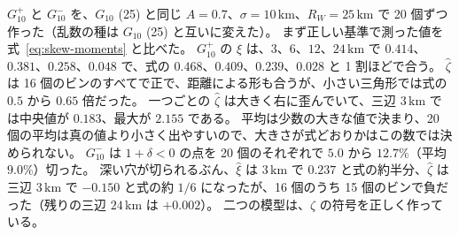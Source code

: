 \documentclass[a4paper,11pt]{ltjsarticle}
\begin{document}
\begin{table}[t]
  \centering
  \caption{表~\ref{tab:vary-r-mocks} と同じ測り方で、$G$ の $R_W$・振幅・場の幅を変えた模擬データ（各 20 個）。
    $G_{\sigma}$ の添字は場の幅 [km]、$G_{10}^{0.4}$ は振幅 $A = 0.4$（ほかは $A = 0.7$）、括弧の中は $R_W$ [km]。}
  \label{tab:vary-r-mocks-g}
  \footnotesize
  \setlength{\tabcolsep}{2.5pt}
  
\end{table}

\begin{table}[t]
  \centering
  \caption{模擬データ（各 20 個）を、$W$ を作る幅 $R_W$ は決めたまま $S$ の幅 $R$ だけを変えて測った $\hat\xi_S$ と $\hat\zeta_S$（ランダムカタログ $8{,}000$ 点）。
    模型の後ろの括弧の中は $R_W$ [km]。値は 20 個の平均。$\overline{\hat\zeta_S}$ は 16 個のビンの平均で、誤差は 20 個のばらつきから求めた平均の誤差。
    「$< 0$」は平均が負のビンの数。}
  \label{tab:vary-r-mocks}
  \footnotesize
  \setlength{\tabcolsep}{2.5pt}
  
\end{table}

\begin{table}[t]
  \centering
  \caption{$S$ の幅 $R$ を変えたコスモスの $\hat\xi_S$ と $\hat\zeta_S$（ランダムカタログ $8{,}000$ 点）。
    $\hat\zeta_S$ は三辺の等しいビンと、16 個のビンの平均 $\overline{\hat\zeta_S}$・負のビンの数。}
  \label{tab:vary-r}
  \footnotesize
  \setlength{\tabcolsep}{4pt}
  
\end{table}

$G_{10}^{+}$ と $G_{10}^{-}$ を、$G_{10}$ (25) と同じ $A = 0.7$、$\sigma = 10\,\mathrm{km}$、$R_W = 25\,\mathrm{km}$ で 20 個ずつ作った（乱数の種は $G_{10}$ (25) と互いに変えた）。
まず正しい基準で測った値を式~\eqref{eq:skew-moments} と比べた。
$G_{10}^{+}$ の $\hat\xi$ は、$3$、$6$、$12$、$24\,\mathrm{km}$ で $0.414$、$0.381$、$0.258$、$0.048$ で、式の $0.468$、$0.409$、$0.239$、$0.028$ と 1 割ほどで合う。
$\hat\zeta$ は 16 個のビンのすべてで正で、距離による形も合うが、小さい三角形では式の $0.5$ から $0.65$ 倍だった。
一つごとの $\hat\zeta$ は大きく右に歪んでいて、三辺 $3\,\mathrm{km}$ では中央値が $0.183$、最大が $2.155$ である。
平均は少数の大きな値で決まり、20 個の平均は真の値より小さく出やすいので、大きさが式どおりかはこの数では決められない。
$G_{10}^{-}$ は $1 + \delta < 0$ の点を 20 個のそれぞれで $5.0$ から $12.7\%$（平均 $9.0\%$）切った。
深い穴が切られるぶん、$\hat\xi$ は $3\,\mathrm{km}$ で $0.237$ と式の約半分、$\hat\zeta$ は三辺 $3\,\mathrm{km}$ で $-0.150$ と式の約 $1/6$ になったが、16 個のうち 15 個のビンで負だった（残りの三辺 $24\,\mathrm{km}$ は $+0.002$）。
二つの模型は、$\zeta$ の符号を正しく作っている。
\end{document}
